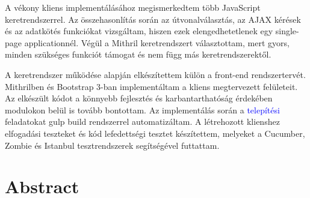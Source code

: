 A vékony kliens implementálásához megismerkedtem több JavaScript keretrendszerrel. Az összehasonlítás során az útvonalválasztás, az AJAX kérések és az adatkötés funkciókat vizsgáltam, hiszen ezek elengedhetetlenek egy single-page applicationnél. Végül a Mithril keretrendszert választottam, mert gyors, minden szükséges funkciót támogat és nem függ más keretrendszerektől.

A keretrendszer működése alapján elkészítettem külön a front-end rendszertervét. Mithrilben és Bootstrap 3-ban implementáltam a kliens megtervezett felületeit. Az elkészült kódot a könnyebb fejlesztés és karbantarthatóság érdekében modulokon belül is tovább bontottam. Az implementálás során a \textcolor{blue}{telepítési} feladatokat gulp build rendszerrel automatizáltam. A létrehozott klienshez elfogadási teszteket és kód lefedettségi tesztet készítettem, melyeket a Cucumber, Zombie és Istanbul tesztrendszerek segítségével futtattam.





\vfill
{}
\englishParagraph


\chapter*{Abstract}



\vfill
\dolgozatnyelve
{}

\setcounter{romanPage}{\value{page}}
